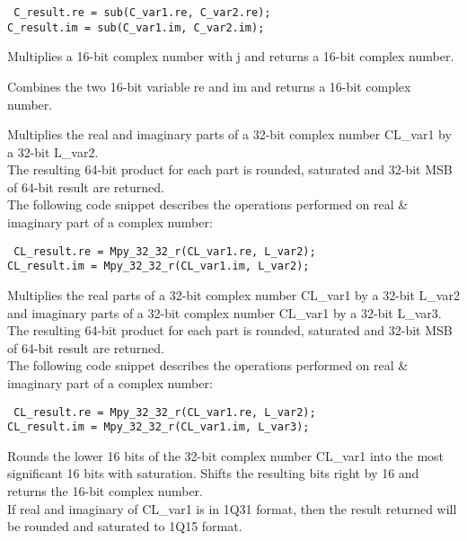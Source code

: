 {\tt {} C\_result.re = sub(C\_var1.re, C\_var2.re);\\
 C\_result.im = sub(C\_var1.im, C\_var2.im);
}


Multiplies a 16-bit complex number with j and returns a 16-bit complex number.


Combines the two 16-bit variable re and im and returns a 16-bit complex number.


Multiplies the real and imaginary parts of a 32-bit complex number CL\_var1 by a 32-bit L\_var2.\\
The resulting 64-bit product for each part is rounded, saturated and 32-bit MSB of 64-bit result are returned.\\
The following code snippet describes the operations performed on real \& imaginary part of a complex number:

{\tt {} CL\_result.re = Mpy\_32\_32\_r(CL\_var1.re, L\_var2);\\
 CL\_result.im = Mpy\_32\_32\_r(CL\_var1.im, L\_var2);
}


Multiplies the real parts of a 32-bit complex number CL\_var1 by a 32-bit L\_var2 and imaginary parts of a 32-bit complex number CL\_var1 by a 32-bit L\_var3.
The resulting 64-bit product for each part is rounded, saturated and 32-bit MSB of 64-bit result are returned.\\
The following code snippet describes the operations performed on real \& imaginary part of a complex number:

{\tt {} CL\_result.re = Mpy\_32\_32\_r(CL\_var1.re, L\_var2);\\
 CL\_result.im = Mpy\_32\_32\_r(CL\_var1.im, L\_var3);
}


Rounds the lower 16 bits of the 32-bit complex number CL\_var1 into the most significant 16 bits with saturation.
Shifts the resulting bits right by 16 and returns the 16-bit complex number.\\
If real and imaginary of CL\_var1 is in 1Q31 format, then the result returned will be rounded and saturated to 1Q15 format.


